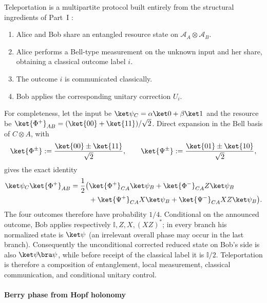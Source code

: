 \documentclass[12pt,a4paper]{article}
\begin{document}
Teleportation is a multipartite protocol built entirely from the structural ingredients of Part~I \cite{Bennett1993}:
\begin{enumerate}[leftmargin=2em]
\item Alice and Bob share an entangled resource state on $\mathcal A_A\otimes\mathcal A_B$.
\item Alice performs a Bell-type measurement on the unknown input and her share, obtaining a classical outcome label $i$.
\item The outcome $i$ is communicated classically.
\item Bob applies the corresponding unitary correction $U_i$.
\end{enumerate}
For completeness, let the input be
\(\ket\psi_C=\alpha\ket0+\beta\ket1\) and the resource be
\(\ket{\Phi^+}_{AB}=(\ket{00}+\ket{11})/\sqrt2\).  Direct expansion in the
Bell basis of \(C\otimes A\), with
\[
 \ket{\Phi^\pm}:=\frac{\ket{00}\pm\ket{11}}{\sqrt2},
 \qquad
 \ket{\Psi^\pm}:=\frac{\ket{01}\pm\ket{10}}{\sqrt2},
\]
gives the exact identity
\begin{align}
\label{p4:eq:teleportation-bell-identity}
 \ket\psi_C\ket{\Phi^+}_{AB}
 =\frac12\bigl(&
 \ket{\Phi^+}_{CA}\ket\psi_B
 +\ket{\Phi^-}_{CA}Z\ket\psi_B\nonumber\\
 &+\ket{\Psi^+}_{CA}X\ket\psi_B
 +\ket{\Psi^-}_{CA}XZ\ket\psi_B
 \bigr).
\end{align}
The four outcomes therefore have probability \(1/4\).  Conditional on the
announced outcome, Bob applies respectively
\(\mathbb I,Z,X,(XZ)^*\); in every branch his normalized state is
\(\ket\psi\) (an irrelevant overall phase may occur in the last branch).
Consequently the unconditional corrected reduced state on Bob's side is
also \(\ket\psi\!\bra\psi\), while before receipt of the classical label it
is \(\mathbb I/2\).
Teleportation is therefore a composition of entanglement, local measurement, classical communication, and conditional unitary control.



\paragraph{Berry phase from Hopf holonomy}
\label{p4:sec:part2-berry}
\end{document}
